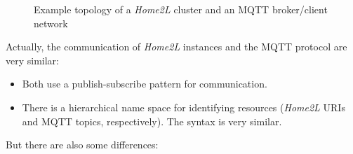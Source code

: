 \documentclass[12pt,english,parskip=half,headheight=19pt]{scrreprt}
\newcommand{\figsvg}[2][]{}            %
\newcommand{\figsvg}[2][]{\href{#2}{}} %
\begin{document}
\begin{figure}[ht]
  \centering
  \figsvg[width=0.9\linewidth]{figs/mqtt-topology.svg}
  \caption[l]{Example topology of a \textit{Home2L} cluster and an MQTT broker/client network}
  \label{fig:mqtt-topology}
\end{figure}





Actually, the communication of \textit{Home2L} instances and the MQTT protocol are very similar:
\begin{itemize}
  \item Both use a publish-subscribe pattern for communication.
  \item There is a hierarchical name space for identifying resources (\textit{Home2L} URIs and MQTT topics, respectively).
    The syntax is very similar.
\end{itemize}

But there are also some differences:
\end{document}
